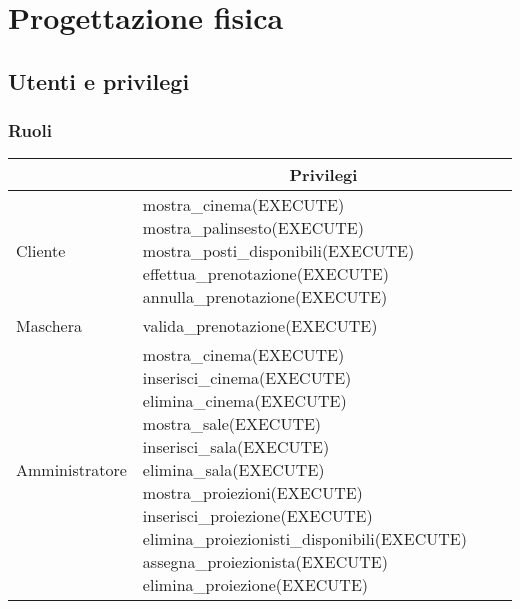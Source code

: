 \section{Progettazione fisica}

\subsection*{Utenti e privilegi}
%
%

\subsubsection*{Ruoli}

\begin{tabularx}{\linewidth}{|X|p{12cm}|}
    \hline
    \rowcolor{tblhdrcolor}
    \multicolumn{1}{|c|}{\textbf{Nome}}
                   & \multicolumn{1}{|c|}{\textbf{Privilegi}}
    \\\hline
    Cliente        &
    mostra\_cinema(EXECUTE) \linebreak
    mostra\_palinsesto(EXECUTE) \linebreak
    mostra\_posti\_disponibili(EXECUTE) \linebreak
    effettua\_prenotazione(EXECUTE) \linebreak
    annulla\_prenotazione(EXECUTE)
    \\\hline
    Maschera       &
    valida\_prenotazione(EXECUTE)
    \\\hline
    Amministratore &
    mostra\_cinema(EXECUTE) \linebreak
    inserisci\_cinema(EXECUTE) \linebreak
    elimina\_cinema(EXECUTE) \linebreak
    mostra\_sale(EXECUTE) \linebreak
    inserisci\_sala(EXECUTE) \linebreak
    elimina\_sala(EXECUTE) \linebreak
    mostra\_proiezioni(EXECUTE) \linebreak
    inserisci\_proiezione(EXECUTE) \linebreak
    elimina\_proiezionisti\_disponibili(EXECUTE) \linebreak
    assegna\_proiezionista(EXECUTE) \linebreak
    elimina\_proiezione(EXECUTE) \linebreak

\end{tabularx}
